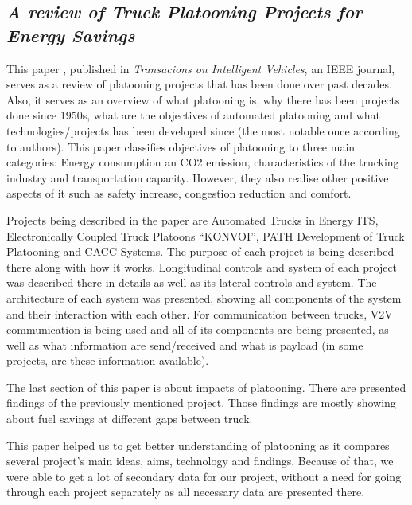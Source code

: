 \subsection{\textit{A review of Truck Platooning Projects for Energy Savings}}

This paper \cite{Tsugawa2016ASavings}, published in \emph{Transacions on Intelligent Vehicles}, an IEEE journal, serves as a review of platooning projects that has been done over past decades. Also, it serves as an overview of what platooning is, why there has been projects done since 1950s, what are the objectives of automated platooning and what technologies/projects has been developed since (the most notable once according to authors).
This paper classifies objectives of platooning to three main categories: Energy consumption an CO2 emission, characteristics of the trucking industry and transportation capacity. However, they also realise other positive aspects of it such as safety increase, congestion reduction and comfort.\par
% 
Projects being described in the paper are Automated Trucks in Energy ITS, Electronically Coupled Truck Platoons “KONVOI”, PATH Development of Truck Platooning and CACC Systems. The purpose of each project is being described there along with how it works. Longitudinal controls and system of each project was described there in details as well as its lateral controls and system. The architecture of each system was presented, showing all components of the system and their interaction with each other. For communication between trucks, V2V communication is being used and all of its components are being presented, as well as what information are send/received and what is payload (in some projects, are these information available).\par
% 
The last section of this paper is about impacts of platooning. There are presented findings of the previously mentioned project. Those findings are mostly showing about fuel savings at different gaps between truck.\par
% 
This paper helped us to get better understanding of platooning as it compares several project’s main ideas, aims, technology and findings. Because of that, we were able to get a lot of secondary data for our project, without a need for going through each project separately as all necessary data are presented there.
